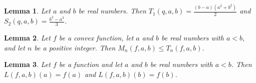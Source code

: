 \documentclass{article}
\newtheorem{lemma}{Lemma}
\begin{document}
\begin{lemma}\label{quadrature}
Let $a$ and $b$ be real numbers. Then $T_1(q,a,b)=\frac{(b-a)(a^2+b^2)}{2}$ and $S_2(q,a,b)=\frac{b^3-a^3}{3}$.
\end{lemma}

\begin{lemma}\label{midpoint}
Let $f$ be a convex function, let $a$ and $b$ be real numbers with $a<b$, and let $n$ be a positive integer. Then $M_n(f,a,b)\le T_n(f,a,b)$.
\end{lemma}

\begin{lemma}\label{interpolant}
Let $f$ be a function and let $a$ and $b$ be real numbers with $a<b$. Then $L(f,a,b)(a)=f(a)$ and $L(f,a,b)(b)=f(b)$.
\end{lemma}
\end{document}
